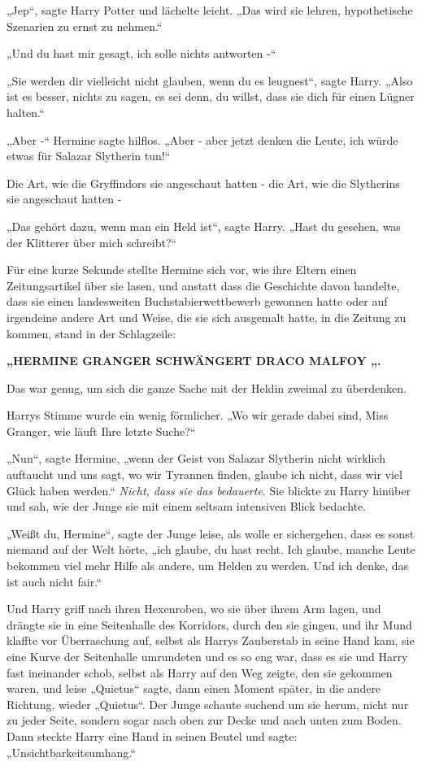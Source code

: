 {„Jep“, sagte Harry Potter und lächelte leicht. „Das wird sie lehren, hypothetische Szenarien zu ernst zu nehmen.“

„Und du hast mir gesagt, ich solle nichts antworten -“

„Sie werden dir vielleicht nicht glauben, wenn du es leugnest“, sagte Harry. „Also ist es besser, nichts zu sagen, es sei denn, du willst, dass sie dich für einen Lügner halten.“

„Aber -“ Hermine sagte hilflos. „Aber - aber jetzt denken die Leute, ich würde etwas für Salazar Slytherin tun!“

Die Art, wie die Gryffindors sie angeschaut hatten - die Art, wie die Slytherins sie angeschaut hatten -

„Das gehört dazu, wenn man ein Held ist“, sagte Harry. „Hast du gesehen, was der Klitterer über mich schreibt?“

Für eine kurze Sekunde stellte Hermine sich vor, wie ihre Eltern einen Zeitungsartikel über sie lasen, und anstatt dass die Geschichte davon handelte, dass sie einen landesweiten Buchstabierwettbewerb gewonnen hatte oder auf irgendeine andere Art und Weise, die sie sich ausgemalt hatte, in die Zeitung zu kommen, stand in der Schlagzeile:

\textbf{„HERMINE GRANGER SCHWÄNGERT DRACO MALFOY „.}

Das war genug, um sich die ganze Sache mit der Heldin zweimal zu überdenken.

Harrys Stimme wurde ein wenig förmlicher. „Wo wir gerade dabei sind, Miss Granger, wie läuft Ihre letzte Suche?“

„Nun“, sagte Hermine, „wenn der Geist von Salazar Slytherin nicht wirklich auftaucht und uns sagt, wo wir Tyrannen finden, glaube ich nicht, dass wir viel Glück haben werden.“ \emph{Nicht, dass sie das bedauerte}. Sie blickte zu Harry hinüber und sah, wie der Junge sie mit einem seltsam intensiven Blick bedachte.

„Weißt du, Hermine“, sagte der Junge leise, als wolle er sichergehen, dass es sonst niemand auf der Welt hörte, „ich glaube, du hast recht. Ich glaube, manche Leute bekommen viel mehr Hilfe als andere, um Helden zu werden. Und ich denke, das ist auch nicht fair.“

Und Harry griff nach ihren Hexenroben, wo sie über ihrem Arm lagen, und drängte sie in eine Seitenhalle des Korridors, durch den sie gingen, und ihr Mund klaffte vor Überraschung auf, selbst als Harrys Zauberstab in seine Hand kam, sie eine Kurve der Seitenhalle umrundeten und es so eng war, dass es sie und Harry fast ineinander schob, selbst als Harry auf den Weg zeigte, den sie gekommen waren, und leise „Quietus“ sagte, dann einen Moment später, in die andere Richtung, wieder „Quietus“. Der Junge schaute suchend um sie herum, nicht nur zu jeder Seite, sondern sogar nach oben zur Decke und nach unten zum Boden. Dann steckte Harry eine Hand in seinen Beutel und sagte: „Unsichtbarkeitsumhang.“

}
